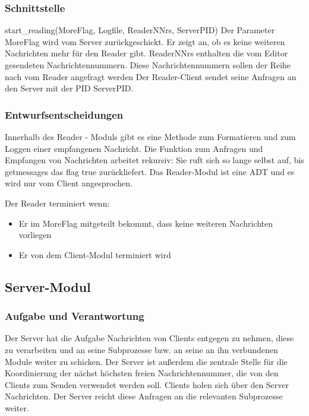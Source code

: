 \documentclass{article}
\begin{document}
\subsubsection{Schnittstelle}
start\_reading(MoreFlag, Logfile, ReaderNNrs, ServerPID)\newline
Der Parameter MoreFlag wird vom Server zurückgeschickt. Er zeigt an, ob es keine weiteren
Nachrichten mehr für den Reader gibt. \newline
ReaderNNrs enthalten die vom Editor gesendeten Nachrichtennummern. Diese Nachrichtennummern
sollen der Reihe nach vom Reader angefragt werden \newline
Der Reader-Client sendet seine Anfragen an den Server mit der PID ServerPID.

\subsubsection{Entwurfsentscheidungen}
Innerhalb des Reader - Moduls gibt es eine Methode zum Formatieren und zum Loggen einer
empfangenen Nachricht.
Die Funktion zum Anfragen und Empfangen von Nachrichten arbeitet rekursiv: Sie ruft sich so
lange selbst auf, bis getmessages das flag true zurückliefert. Das Reader-Modul ist eine ADT
und es wird nur vom Client angesprochen.

Der Reader terminiert wenn: 
\begin{itemize}
    \item Er im MoreFlag mitgeteilt bekommt, dass keine weiteren Nachrichten vorliegen
    \item Er von dem Client-Modul terminiert wird 
\end{itemize}

\subsection{Server-Modul}
\subsubsection{Aufgabe und Verantwortung}
Der Server hat die Aufgabe Nachrichten von Clients entgegen zu nehmen, diese zu verarbeiten und an seine Subprozesse
bzw. an seine an ihn verbundenen Module weiter zu schicken. Der Server ist außerdem die zentrale Stelle für die
Koordinierung der nächst höchsten freien Nachrichtennummer, die von den Clients zum Senden verwendet werden soll.
Clients holen sich über den Server Nachrichten. Der Server reicht diese Anfragen an die relevanten Subprozesse weiter.
\end{document}
